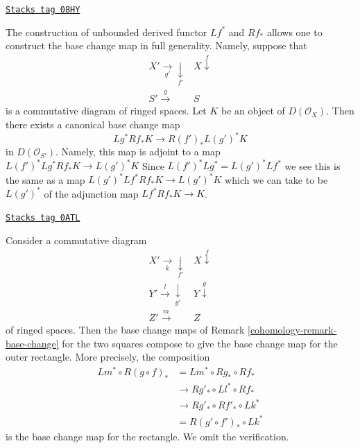 \begin{remark}
\label{cohomology-remark-base-change}
\href{https://stacks.math.columbia.edu/tag/08HY}{\texttt{Stacks tag 08HY}}

The construction of unbounded derived functor $Lf^*$ and $Rf_*$
allows one to construct the base change map in full generality.
Namely, suppose that
$$
\begin{array}{cc}X' \underset{g'}{\longrightarrow}\underset{f'}{\downarrow} & X \overset{f}{\downarrow} \\ S' \overset{g}{\longrightarrow} & S\end{array}
$$
is a commutative diagram of ringed spaces. Let $K$ be an object of
$D(\mathcal{O}_X)$. Then there exists a canonical base change
map
$$
Lg^*Rf_*K \longrightarrow R(f')_*L(g')^*K
$$
in $D(\mathcal{O}_{S'})$. Namely, this map is adjoint to a map
$L(f')^*Lg^*Rf_*K \to L(g')^*K$
Since $L(f')^*Lg^* = L(g')^*Lf^*$ we see this is the same as a map
$L(g')^*Lf^*Rf_*K \to L(g')^*K$
which we can take to be $L(g')^*$ of the adjunction map
$Lf^*Rf_*K \to K$.
\end{remark}

\begin{remark}
\label{cohomology-remark-compose-base-change}
\href{https://stacks.math.columbia.edu/tag/0ATL}{\texttt{Stacks tag 0ATL}}

Consider a commutative diagram
$$
\begin{array}{cc}X' \underset{k}{\longrightarrow}\underset{f'}{\downarrow} & X \overset{f}{\downarrow} \\ Y' \overset{l}{\longrightarrow}\underset{g'}{\downarrow} & Y \overset{g}{\downarrow} \\ Z' \overset{m}{\longrightarrow} & Z\end{array}
$$
of ringed spaces. Then the base change maps of
Remark \ref{cohomology-remark-base-change}
for the two squares compose to give the base
change map for the outer rectangle. More precisely,
the composition
\begin{align*}
Lm^* \circ R(g \circ f)_*
& =
Lm^* \circ Rg_* \circ Rf_* \\
& \to Rg'_* \circ Ll^* \circ Rf_* \\
& \to Rg'_* \circ Rf'_* \circ Lk^* \\
& = R(g' \circ f')_* \circ Lk^*
\end{align*}
is the base change map for the rectangle. We omit the verification.
\end{remark}

